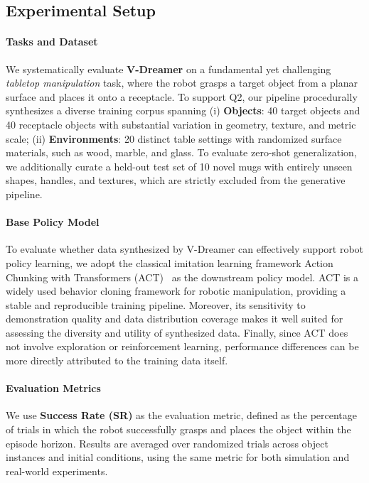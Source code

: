 \subsection{Experimental Setup}

\paragraph{Tasks and Dataset}
We systematically evaluate \textbf{V-Dreamer} on a fundamental yet challenging \textit{tabletop manipulation} task, where the robot grasps a target object from a planar surface and places it onto a receptacle. To support Q2, our pipeline procedurally synthesizes a diverse training corpus spanning (i) \textbf{Objects}: 40 target objects and 40 receptacle objects with substantial variation in geometry, texture, and metric scale; (ii) \textbf{Environments}: 20 distinct table settings with randomized surface materials, such as wood, marble, and glass. To evaluate zero-shot generalization, we additionally curate a held-out test set of 10 novel mugs with entirely unseen shapes, handles, and textures, which are strictly excluded from the generative pipeline.

\paragraph{Base Policy Model}
To evaluate whether data synthesized by V-Dreamer can effectively support robot policy learning, we adopt the classical imitation learning framework Action Chunking with Transformers (ACT)~\cite{zhao2023learning} as the downstream policy model. ACT is a widely used behavior cloning framework for robotic manipulation, providing a stable and reproducible training pipeline. Moreover, its sensitivity to demonstration quality and data distribution coverage makes it well suited for assessing the diversity and utility of synthesized data. Finally, since ACT does not involve exploration or reinforcement learning, performance differences can be more directly attributed to the training data itself.

\paragraph{Evaluation Metrics}
We use \textbf{Success Rate (SR)} as the evaluation metric, defined as the percentage of trials in which the robot successfully grasps and places the object within the episode horizon. Results are averaged over randomized trials across object instances and initial conditions, using the same metric for both simulation and real-world experiments.

